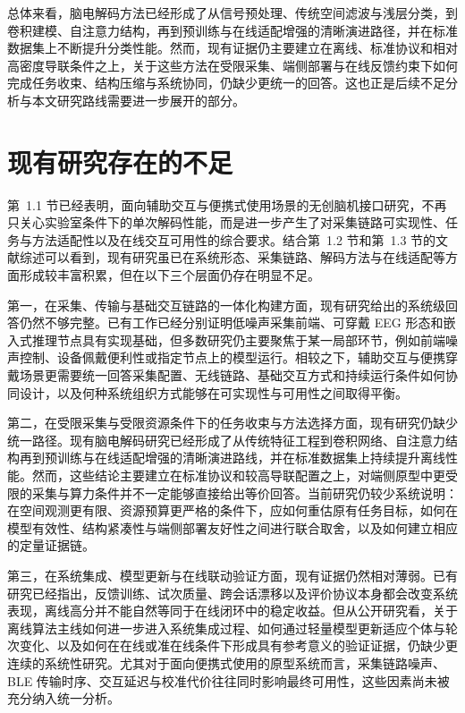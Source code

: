 总体来看，脑电解码方法已经形成了从信号预处理、传统空间滤波与浅层分类，到卷积建模、自注意力结构，再到预训练与在线适配增强的清晰演进路径，并在标准数据集上不断提升分类性能。然而，现有证据仍主要建立在离线、标准协议和相对高密度导联条件之上，关于这些方法在受限采集、端侧部署与在线反馈约束下如何完成任务收束、结构压缩与系统协同，仍缺少更统一的回答。这也正是后续不足分析与本文研究路线需要进一步展开的部分。

\section{现有研究存在的不足}

第~1.1 节已经表明，面向辅助交互与便携式使用场景的无创脑机接口研究，不再只关心实验室条件下的单次解码性能，而是进一步产生了对采集链路可实现性、任务与方法适配性以及在线交互可用性的综合要求。结合第~1.2 节和第~1.3 节的文献综述可以看到，现有研究虽已在系统形态、采集链路、解码方法与在线适配等方面形成较丰富积累，但在以下三个层面仍存在明显不足。

第一，在采集、传输与基础交互链路的一体化构建方面，现有研究给出的系统级回答仍然不够完整。已有工作已经分别证明低噪声采集前端、可穿戴 EEG 形态和嵌入式推理节点具有实现基础，但多数研究仍主要聚焦于某一局部环节，例如前端噪声控制、设备佩戴便利性或指定节点上的模型运行。相较之下，辅助交互与便携穿戴场景更需要统一回答采集配置、无线链路、基础交互方式和持续运行条件如何协同设计，以及何种系统组织方式能够在可实现性与可用性之间取得平衡。

第二，在受限采集与受限资源条件下的任务收束与方法选择方面，现有研究仍缺少统一路径。现有脑电解码研究已经形成了从传统特征工程到卷积网络、自注意力结构再到预训练与在线适配增强的清晰演进路线，并在标准数据集上持续提升离线性能。然而，这些结论主要建立在标准协议和较高导联配置之上，对端侧原型中更受限的采集与算力条件并不一定能够直接给出等价回答。当前研究仍较少系统说明：在空间观测更有限、资源预算更严格的条件下，应如何重估原有任务目标，如何在模型有效性、结构紧凑性与端侧部署友好性之间进行联合取舍，以及如何建立相应的定量证据链。

第三，在系统集成、模型更新与在线联动验证方面，现有证据仍然相对薄弱。已有研究已经指出，反馈训练、试次质量、跨会话漂移以及评价协议本身都会改变系统表现，离线高分并不能自然等同于在线闭环中的稳定收益。但从公开研究看，关于离线算法主线如何进一步进入系统集成过程、如何通过轻量模型更新适应个体与轮次变化、以及如何在在线或准在线条件下形成具有参考意义的验证证据，仍缺少更连续的系统性研究。尤其对于面向便携式使用的原型系统而言，采集链路噪声、BLE 传输时序、交互延迟与校准代价往往同时影响最终可用性，这些因素尚未被充分纳入统一分析。

